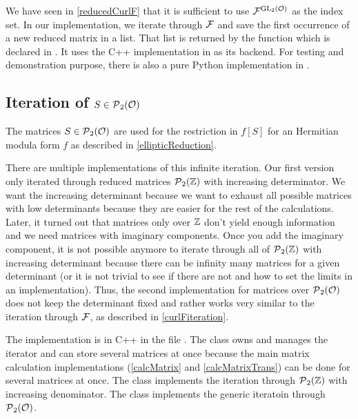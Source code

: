We have seen in \cref{reducedCurlF} that it is sufficient to use ${\mathcal{F}}^{\operatorname{GL}_2(\mathcal{O})}$ as the index set. In our implementation, we iterate through $\mathcal{F}$ and save the first occurrence of a new reduced matrix in a list. That list is returned by the function  which is declared in . It uses the C++ implementation in  as its backend. For testing and demonstration purpose, there is also a pure Python implementation  in .


\subsection{Iteration of $S \in \operatorname{\mathcal{P}}_2(\mathcal{O})$}
\label{Siter}

The matrices $S \in \operatorname{\mathcal{P}}_2(\mathcal{O})$ are used for the restriction in $f[S]$ for an Hermitian modula form $f$ as described in \cref{ellipticReduction}.

There are multiple implementations of this infinite iteration. Our first version only iterated through reduced matrices $\operatorname{\mathcal{P}}_2(\mathbb{Z})$ with increasing determinator. We want the increasing determinant because we want to exhaust all possible matrices with low determinants because they are easier for the rest of the calculations. Later, it turned out that matrices only over $\mathbb{Z}$ don't yield enough information and we need matrices with imaginary components. Once you add the imaginary component, it is not possible anymore to iterate through all of $\operatorname{\mathcal{P}}_2(\mathbb{Z})$ with increasing determinant because there can be infinity many matrices for a given determinant (or it is not trivial to see if there are not and how to set the limits in an implementation). Thus, the second implementation for matrices over $\operatorname{\mathcal{P}}_2(\mathcal{O})$ does not keep the determinant fixed and rather works very similar to the iteration through $\mathcal{F}$, as described in \cref{curlFiteration}.

The implementation is in C++ in the file . The class  owns and manages the iterator and can store several matrices at once because the main matrix calculation implementations (\cref{calcMatrix} and \cref{calcMatrixTrans}) can be done for several matrices at once. The class  implements the iteration through $\operatorname{\mathcal{P}}_2(\mathbb{Z})$ with increasing denominator. The class  implements the generic iteratoin through $\operatorname{\mathcal{P}}_2(\mathcal{O})$.

